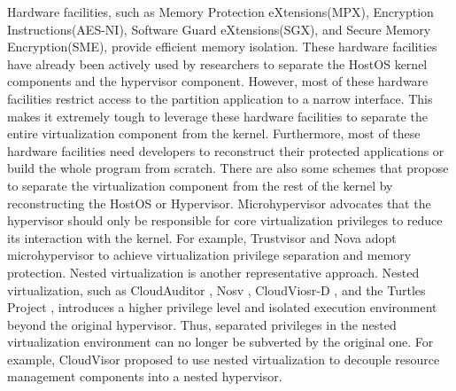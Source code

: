 
Hardware facilities, such as Memory Protection eXtensions(MPX), Encryption Instructions(AES-NI), Software Guard eXtensions(SGX), and Secure Memory Encryption(SME), provide efficient memory isolation. These hardware facilities have already been actively used by researchers to separate the HostOS kernel components and the hypervisor component. 
However, most of these hardware facilities restrict access to the partition application to a narrow interface.
This makes it extremely tough to leverage these hardware facilities to separate the entire virtualization component from the kernel. Furthermore, most of these hardware facilities need developers to reconstruct their protected applications or build the whole program from scratch. 
There are also some schemes that propose to separate the virtualization component from the rest of the kernel by reconstructing the HostOS or Hypervisor.
Microhypervisor advocates that the hypervisor should only be responsible for core virtualization privileges to reduce its interaction with the kernel. For example, Trustvisor and Nova adopt microhypervisor to achieve virtualization privilege separation and memory protection. 
Nested virtualization is another representative approach. 
Nested virtualization, such as CloudAuditor \cite{Wang2016CloudAuditorAC}, Nosv \cite{REN2017137}, CloudViosr-D \cite{mi2020mostly}, and the Turtles Project \cite{183330}, introduces a higher privilege level and isolated execution environment beyond the original hypervisor. 
Thus, separated privileges in the nested virtualization environment can no longer be subverted by the original one. For example, CloudVisor \cite{10.1145/2043556.2043576} proposed to use nested virtualization to decouple resource management components into a nested hypervisor. 
